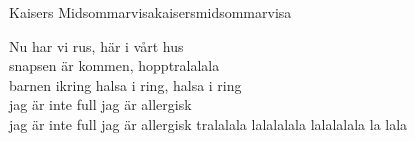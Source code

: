 \begin{song}{Kaisers Midsommarvisa}{kaisersmidsommarvisa}
\begin{vers}
Nu har vi rus, här i vårt hus\\
snapsen är kommen, hopptralalala\\
barnen ikring halsa i ring, halsa i ring\\
\repopen jag är inte full jag är allergisk\\
jag är inte full jag är allergisk
tralalala lalalalala lalalalala la lala \repclose\\
\end{vers}
\end{song}
